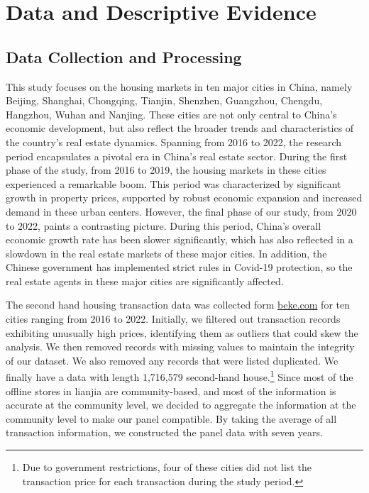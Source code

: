 \documentclass[12pt]{article}
\begin{document}
\section{Data and Descriptive Evidence \label{sec:data}}

\subsection{Data Collection and Processing} \label{subsec:data_collection}

This study focuses on the housing markets in ten major cities in China, namely Beijing, Shanghai, Chongqing, Tianjin, Shenzhen, Guangzhou, Chengdu, Hangzhou, Wuhan and Nanjing. These cities are not only central to China's economic development, but also reflect the broader trends and characteristics of the country's real estate dynamics. Spanning from 2016 to 2022, the research period encapsulates a pivotal era in China's real estate sector. During the first phase of the study, from 2016 to 2019, the housing markets in these cities experienced a remarkable boom. This period was characterized by significant growth in property prices, supported by robust economic expansion and increased demand in these urban centers. However, the final phase of our study, from 2020 to 2022, paints a contrasting picture. During this period, China's overall economic growth rate has been slower significantly, which has also reflected in a slowdown in the real estate markets of these major cities. In addition, the Chinese government has implemented strict rules in Covid-19 protection, so the real estate agents in these major cities are significantly affected.

The second hand housing transaction data was collected form \href{https://www.ke.com/city/}{beke.com} for ten cities ranging from 2016 to 2022. Initially, we filtered out transaction records exhibiting unusually high prices, identifying them as outliers that could skew the analysis. We then removed records with missing values to maintain the integrity of our dataset. We also removed any records that were listed duplicated. We finally have a data with length 1,716,579 second-hand house.\footnote{Due to government restrictions, four of these cities did not list the transaction price for each transaction during the study period.} Since most of the offline stores in lianjia are community-based, and most of the information is accurate at the community level, we decided to aggregate the information at the community level to make our panel compatible. By taking the average of all transaction information, we constructed the panel data with seven years.
\end{document}
